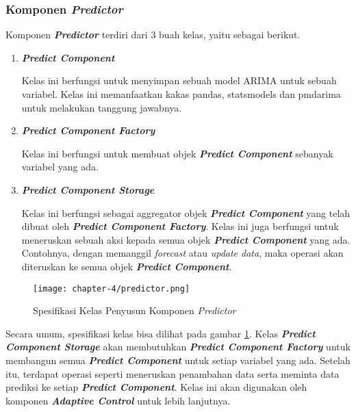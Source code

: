 \subsubsection{Komponen \textit{Predictor}}
Komponen \textbf{\textit{Predictor}} terdiri dari 3 buah kelas, yaitu sebagai berikut.
\begin{enumerate}
    \item \textbf{\textit{Predict Component}}
    
    Kelas ini berfungsi untuk menyimpan sebuah model ARIMA untuk sebuah variabel. Kelas ini memanfaatkan kakas pandas, statsmodels dan pmdarima untuk melakukan tanggung jawabnya.

    \item \textbf{\textit{Predict Component Factory}}
    
    Kelas ini berfungsi untuk membuat objek \textbf{\textit{Predict Component}} sebanyak variabel yang ada. 

    \item \textbf{\textit{Predict Component Storage}}
    
    Kelas ini berfungsi sebagai aggregator objek \textbf{\textit{Predict Component}} yang telah dibuat oleh \textbf{\textit{Predict Component Factory}}. Kelas ini juga berfungsi untuk meneruskan sebuah aksi kepada semua objek \textbf{\textit{Predict Component}} yang ada. Contohnya, dengan memanggil \textit{forecast} atau \textit{update data}, maka operasi akan diteruskan ke semua objek \textbf{\textit{Predict Component}}.

\end{enumerate}

\begin{figure}[h]
    \centering
    \texttt{[image: chapter-4/predictor.png]}
    \caption{Spesifikasi Kelas Penyusun Komponen \textit{Predictor}}
    \label{fig:predictor-spek}
\end{figure}

Secara umum, spesifikasi kelas bisa dilihat pada gambar \ref{fig:predictor-spek}. Kelas \textbf{\textit{Predict Component Storage}} akan membutuhkan \textbf{\textit{Predict Component Factory}} untuk membangun semua \textbf{\textit{Predict Component}} untuk setiap variabel yang ada. Setelah itu, terdapat operasi seperti meneruskan penambahan data serta meminta data prediksi ke setiap \textbf{\textit{Predict Component}}. Kelas ini akan digunakan oleh komponen \textbf{\textit{Adaptive Control}} untuk lebih lanjutnya.

